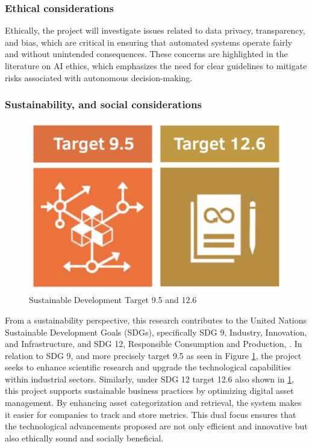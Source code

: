 \documentclass[a4paper,12pt,twocolumn]{article}
\numberwithin{figure}{section}
\numberwithin{table}{section}
\begin{document}
\vspace{0.3cm}
\subsubsection{Ethical considerations}
\vspace{0.2cm}
Ethically, the project will investigate issues related to data privacy, 
 transparency, and bias, which are critical in ensuring that 
automated systems operate fairly and without unintended consequences. 
These concerns are highlighted in the literature on AI ethics, which emphasizes 
the need for clear guidelines to mitigate risks associated with autonomous decision-making.
\citep{jobin2019global}

\vspace{0.3cm}
\subsubsection{Sustainability, and social considerations}
\vspace{0.2cm}
\begin{figure}[htbp]
    \centering
    \includegraphics[width=0.7\linewidth]{targets.png}  %
    \caption{Sustainable Development Target 9.5 and 12.6}
    \label{fig:targets}  
\end{figure}

From a sustainability perspective, this research contributes to the United Nations Sustainable 
Development Goals (SDGs), specifically SDG 9, Industry, Innovation, and Infrastructure, and SDG 12, 
Responsible Consumption and Production, \citep{UN2030Agenda}. 
In relation to SDG 9, and more precisely 
target 9.5 as seen in Figure \ref{fig:targets}, the project seeks to enhance scientific 
research and upgrade the technological capabilities
 within industrial sectors. Similarly, under SDG 12 target 12.6 also shown in \ref{fig:targets}, 
 this project supports sustainable business practices by optimizing digital 
asset management. By enhancing asset categorization and retrieval, the system makes it easier 
for companies to track and store metrics. This dual focus ensures that the technological advancements 
proposed are not only efficient and innovative but also ethically sound and socially beneficial.
\end{document}

